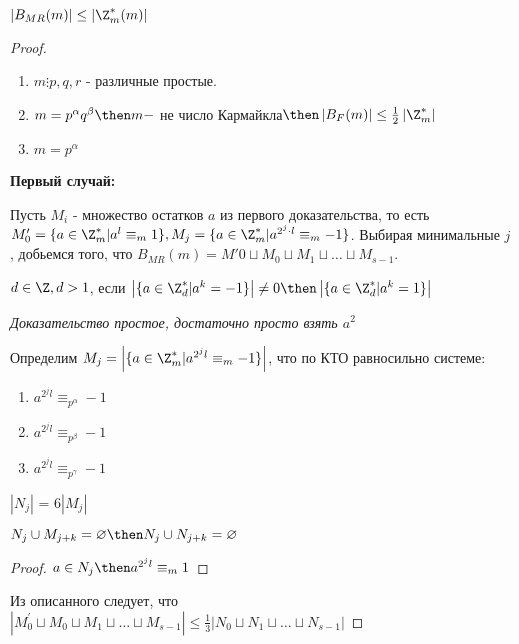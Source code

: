 \begin{proposition}
  $\left|B_{MR}(m)\right| \le \left|\Z_m^*(m)\right|$
\end{proposition}
\begin{proof}
  \begin{enumerate}
    \item $m \vdots p, q, r$ - различные простые.
    \item $m = p^\alpha q^\beta \then m - $ не число Кармайкла$\then \left| B_F(m)\right| \le \frac{1}{2}\left|\Z_m^*\right|$
    \item $m = p ^ \alpha$
  \end{enumerate} 

  \textbf{Первый случай:}
  
  Пусть $M_i$ - множество остатков $a$ из первого доказательства, то есть $M_0' = \{a \in \Z_m^* | a^l \equiv_m 1\}, M_j = \{a \in \Z_m^* | a^{2^j \cdot l} \equiv_m -1\}$. Выбирая минимальные $j$, добьемся того, что $B_{MR}(m) = M'0 \sqcup M_0 \sqcup M_1 \sqcup \dots \sqcup M_{s-1}$.

  \begin{proposition}
    $d \in \Z, d > 1$, если $\left|\{a \in \Z_d^* | a^k = -1\}\right| \ne 0 \then \left|\{a \in \Z_d^* | a^k = 1\}\right|$
  \end{proposition}

  \textit{Доказательство простое, достаточно просто взять $a^2$}

  Определим $M_j = \left|\{a \in \Z_m^* | a^{2^j l} \equiv_m -1\}\right|$, что по КТО равносильно системе:
  \begin{enumerate}
    \item $a^{2^j l} \equiv_{p^\alpha} -1$
    \item $a^{2^j l} \equiv_{p^\beta} -1$
     \item $a^{2^j l} \equiv_{p^\gamma} -1$
  \end{enumerate}
  
  \begin{proposition}
    $|N_j|$ = $6 |M_j|$ 
  \end{proposition}

  \begin{proposition}
    $N_j \cup M_{j + k} = \varnothing \then N_j \cup N_{j + k} = \varnothing$
  \end{proposition}

  \begin{proof}
    $a \in N_j \then a^{2^{j}l} \equiv_{m} 1 $
  \end{proof}

  Из описанного следует, что $|M^'_0 \sqcup M_0 \sqcup M_1 \sqcup \dots \sqcup M_{s - 1}| \le \frac{1}{3} |N_0 \sqcup N_1 \sqcup \dots \sqcup N_{s - 1}|$
\end{proof}
